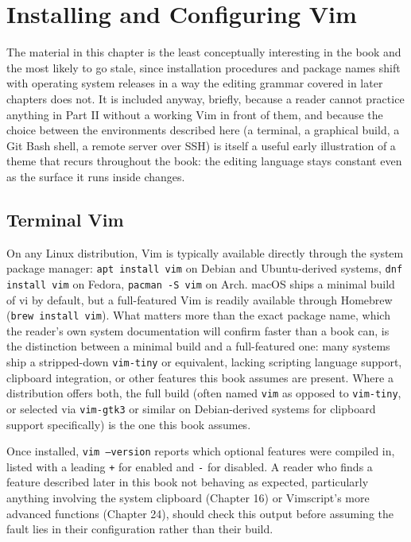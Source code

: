 \chapter{Installing and Configuring Vim}
\label{ch:installing}

The material in this chapter is the least conceptually interesting in the book and the most likely to go stale, since installation procedures and package names shift with operating system releases in a way the editing grammar covered in later chapters does not. It is included anyway, briefly, because a reader cannot practice anything in Part II without a working Vim in front of them, and because the choice between the environments described here (a terminal, a graphical build, a Git Bash shell, a remote server over SSH) is itself a useful early illustration of a theme that recurs throughout the book: the editing language stays constant even as the surface it runs inside changes.

\section{Terminal Vim}

On any Linux distribution, Vim is typically available directly through the system package manager: \texttt{apt install vim} on Debian and Ubuntu-derived systems, \texttt{dnf install vim} on Fedora, \texttt{pacman -S vim} on Arch. macOS ships a minimal build of vi by default, but a full-featured Vim is readily available through Homebrew (\texttt{brew install vim}). What matters more than the exact package name, which the reader's own system documentation will confirm faster than a book can, is the distinction between a minimal build and a full-featured one: many systems ship a stripped-down \texttt{vim-tiny} or equivalent, lacking scripting language support, clipboard integration, or other features this book assumes are present. Where a distribution offers both, the full build (often named \texttt{vim} as opposed to \texttt{vim-tiny}, or selected via \texttt{vim-gtk3} or similar on Debian-derived systems for clipboard support specifically) is the one this book assumes.

Once installed, \texttt{vim --version} reports which optional features were compiled in, listed with a leading \texttt{+} for enabled and \texttt{-} for disabled. A reader who finds a feature described later in this book not behaving as expected, particularly anything involving the system clipboard (Chapter 16) or Vimscript's more advanced functions (Chapter 24), should check this output before assuming the fault lies in their configuration rather than their build.

